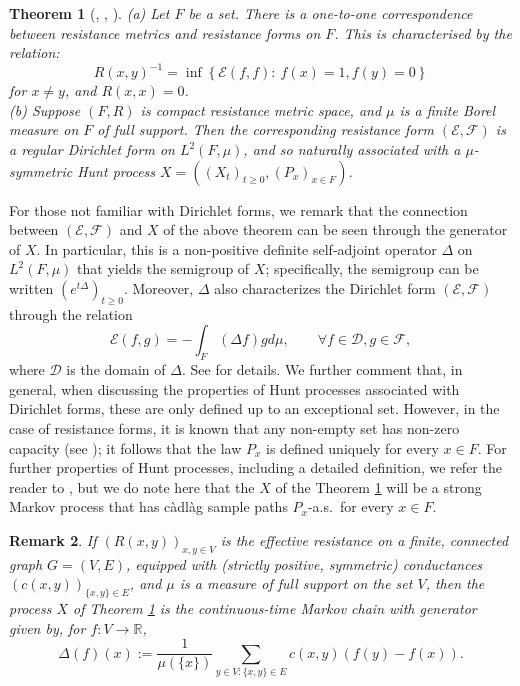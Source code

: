 \documentclass[a4paper, 11pt]{article}
\newtheorem{theorem}{Theorem}[section]
\newtheorem{rem}[theorem]{Remark}
\begin{document}
\begin{theorem}[{\cite[Theorems 2.3.4, 2.3.6]{AOF}, \cite[Corollary 6.4 and Theorem 9.4]{Kigres}, \cite[Theorem 7.2.1]{FOT}}]\label{hunt} (a) Let $F$ be a set. There is a one-to-one correspondence between resistance metrics and resistance forms on $F$. This is characterised by the relation:
\[R(x,y)^{-1}=\inf\left\{\mathcal{E}(f,f):\:f(x)=1,f(y)=0\right\}\]
for $x\neq y$, and $R(x,x)=0$.\\
(b) Suppose $(F,R)$ is compact resistance metric space, and $\mu$ is a finite Borel measure on $F$ of full support. Then the corresponding resistance form $(\mathcal{E},\mathcal{F})$ is a regular Dirichlet form on $L^2(F,\mu)$, and so naturally associated with a $\mu$-symmetric Hunt process $X=((X_t)_{t\geq 0},(P_x)_{x\in F})$.
\end{theorem}

For those not familiar with Dirichlet forms, we remark that the connection between $(\mathcal{E},\mathcal{F})$ and $X$ of the above theorem can be seen through the generator of $X$. In particular, this is a non-positive definite self-adjoint operator $\Delta$ on $L^2(F,\mu)$ that yields the semigroup of $X$; specifically, the semigroup can be written $(e^{t\Delta})_{t\geq 0}$. Moreover, $\Delta$ also characterizes the Dirichlet form $(\mathcal{E},\mathcal{F})$ through the relation
\[\mathcal{E}(f,g)=-\int_F (\Delta f)  gd\mu,\qquad \forall f\in\mathcal{D},g\in\mathcal{F},\]
where $\mathcal{D}$ is the domain of $\Delta$. See \cite[Chapter 1]{FOT} for details. We further comment that, in general, when discussing the properties of Hunt processes associated with Dirichlet forms, these are only defined up to an exceptional set. However, in the case of resistance forms, it is known that any non-empty set has non-zero capacity (see \cite[Theorem 9.9]{Kigres}); it follows that the law $P_x$ is defined uniquely for every $x\in F$. For further properties of Hunt processes, including a detailed definition, we refer the reader to \cite[Section A.2]{FOT}, but we do note here that the $X$ of the Theorem \ref{hunt} will be a strong Markov process that has c\`{a}dl\`{a}g sample paths $P_x$-a.s.\ for every $x\in F$.

\begin{rem}\label{resrem}
If $(R(x,y))_{x,y\in V}$ is the effective resistance on a finite, connected graph $G=(V,E)$, equipped with (strictly positive, symmetric) conductances $(c(x,y))_{\{x,y\}\in E}$, and $\mu$ is a measure of full support on the set $V$, then the process $X$ of Theorem \ref{hunt} is the continuous-time Markov chain with generator given by, for $f:V\rightarrow\mathbb{R}$,
\[\Delta(f)(x):=\frac{1}{\mu(\{x\})}\sum_{y\in V:\{x,y\}\in E}c(x,y)(f(y)-f(x)).\]
\end{rem}
\end{document}
